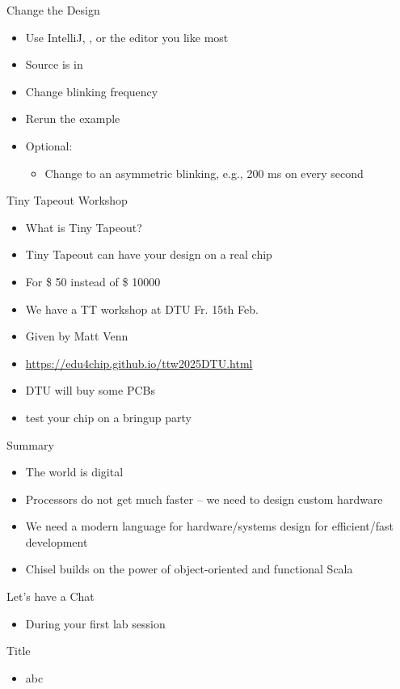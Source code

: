 \begin{frame}[fragile]{Change the Design}
\begin{itemize}
\item Use IntelliJ, , or the editor you like most
\item Source is in 
\item Change blinking frequency
\item Rerun the example
\item Optional:
\begin{itemize}
\item Change to an asymmetric blinking, e.g., 200 ms on every second 
\end{itemize}
\end{itemize}
\end{frame}

\begin{frame}[fragile]{Tiny Tapeout Workshop}
\begin{itemize}
\item What is Tiny Tapeout?
\item Tiny Tapeout can have your design on a real chip
\item For \$ 50 instead of \$ 10000
\item We have a TT workshop at DTU Fr. 15th Feb.
\item Given by Matt Venn
\item \url{https://edu4chip.github.io/ttw2025DTU.html}
\item DTU will buy some PCBs
\item test your chip on a bringup party
\end{itemize}
\end{frame}

\begin{frame}[fragile]{Summary}
\begin{itemize}
\item The world is digital
\item Processors do not get much faster -- we need to design custom hardware
\item We need a modern language for hardware/systems design for efficient/fast development
\item Chisel builds on the power of object-oriented and functional Scala
\end{itemize}
\end{frame}

\begin{frame}[fragile]{Let's have a Chat}
\begin{itemize}
\item During your first lab session
\end{itemize}
\end{frame}



\begin{frame}[fragile]{Title}
\begin{itemize}
\item abc
\end{itemize}
\end{frame}
